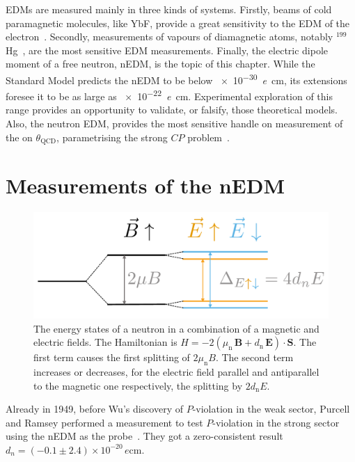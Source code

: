 EDMs are measured mainly in three kinds of systems. Firstly, beams of cold paramagnetic molecules, like YbF, provide a great sensitivity to the EDM of the electron~\cite{Hudson2011}. Secondly, measurements of vapours of diamagnetic atoms, notably $^{199}$Hg~\cite{PhysRevLett.116.161601}, are the most sensitive EDM measurements. Finally, the electric dipole moment of a free neutron, nEDM, is the topic of this chapter. While the Standard Model predicts the nEDM to be below \SI{e-30}{\elementarycharge\centi\meter}, its extensions foresee it to be
as large as \SI{e-22}{\elementarycharge\centi\meter}.
Experimental exploration of this range provides an opportunity to validate, or falsify, those theoretical models. Also, the neutron EDM, provides the most sensitive handle on measurement of the on $\theta_\text{QCD}$, parametrising the strong $CP$ problem~\cite{PDG2016}.



\section{Measurements of the nEDM}

\begin{figure}
  \centering
  \includegraphics[width=0.7\linewidth]{gfx/introduction/measurement_principle.pdf}
  \caption{The energy states of a neutron in a combination of a magnetic and electric fields. The Hamiltonian is $H = - 2 \left( \mu_\text{n} \, \mathbf{B} + d_\text{n} \, \mathbf{E} \right ) \cdot \mathbf{S}$. The first term causes the first splitting of $2\mu_\text{n} B$. The second term increases or decreases, for the electric field parallel and antiparallel to the magnetic one respectively, the splitting by $2 d_\text{n} E$.}\label{fig:nEDM_measurement_principle}
\end{figure}

Already in 1949, before Wu's discovery of $P$-violation in the weak sector, Purcell and Ramsey performed a measurement to test $P$-violation in the strong sector using the nEDM as the probe~\cite{PhysRev.108.120}. They got a zero-consistent result $d_n = (-0.1 \pm 2.4) \times 10^{-20}\,\si{\elementarycharge\centi\meter}$.

